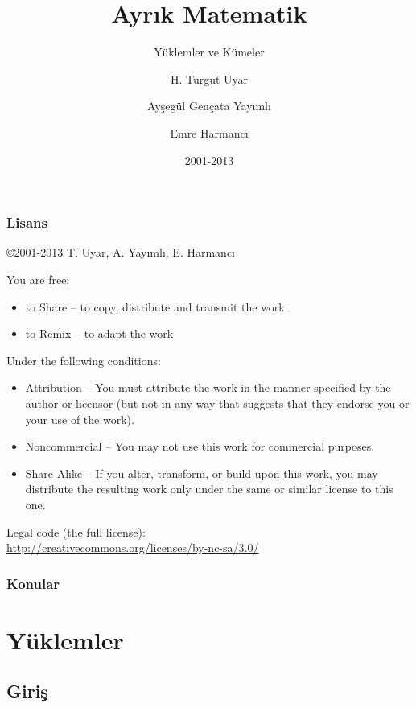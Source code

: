 \documentclass[dvipsnames]{beamer}
\title{Ayrık Matematik}
\subtitle{Yüklemler ve Kümeler}
\author{H. Turgut Uyar \and Ayşegül Gençata Yayımlı \and Emre Harmancı}
\date{2001-2013}
\theoremstyle{definition}
\theoremstyle{example}
\theoremstyle{plain}
\begin{document}
\begin{frame}
  \titlepage
\end{frame}

\begin{frame}
  \frametitle{Lisans}

  \hfill
  \copyright 2001-2013 T. Uyar, A. Yayımlı, E. Harmancı

  \vfill
  \begin{tiny}
    You are free:
    \begin{itemize}
      \item to Share -- to copy, distribute and transmit the work
      \item to Remix -- to adapt the work
    \end{itemize}

    Under the following conditions:
    \begin{itemize}
      \item Attribution -- You must attribute the work in the manner specified by
        the author or licensor (but not in any way that suggests that they
        endorse you or your use of the work).

      \item Noncommercial -- You may not use this work for commercial purposes.

      \item Share Alike -- If you alter, transform, or build upon this work, you
        may distribute the resulting work only under the same or similar license
        to this one.
    \end{itemize}
  \end{tiny}

  \vfill
  Legal code (the full license):\\
  \url{http://creativecommons.org/licenses/by-nc-sa/3.0/}
\end{frame}

\begin{frame}
  \frametitle{Konular}
  \tableofcontents
\end{frame}

\section{Yüklemler}

\subsection{Giriş}
\end{document}
